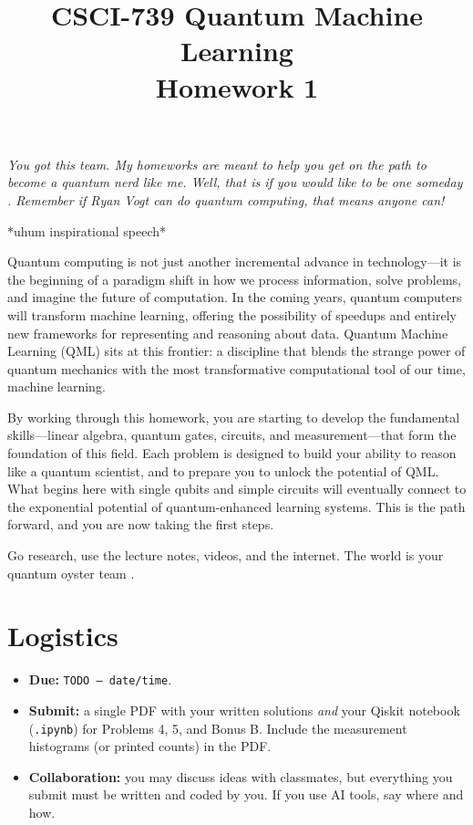 \documentclass[11pt]{article}
\title{CSCI-739 Quantum Machine Learning\\[2pt]
\large Homework 1}
\date{} %
\newcounter{problem}
\begin{document}
\maketitle

\begin{center}
\textit{You got this team. My homeworks are meant to help you get on the path to become a quantum nerd like me. Well, that is if you would like to be one someday \smiley{}. Remember if Ryan Vogt can do quantum computing, that means anyone can! }
\end{center}

\vspace{1em}

\noindent
*uhum inspirational speech*

Quantum computing is not just another incremental advance in technology—it is the beginning of a paradigm shift in how we process information, solve problems, and imagine the future of computation. In the coming years, quantum computers will transform machine learning, offering the possibility of speedups and entirely new frameworks for representing and reasoning about data. Quantum Machine Learning (QML) sits at this frontier: a discipline that blends the strange power of quantum mechanics with the most transformative computational tool of our time, machine learning. 

By working through this homework, you are starting to develop the fundamental skills—linear algebra, quantum gates, circuits, and measurement—that form the foundation of this field. Each problem is designed to build your ability to reason like a quantum scientist, and to prepare you to unlock the potential of QML. What begins here with single qubits and simple circuits will eventually connect to the exponential potential of quantum-enhanced learning systems. This is the path forward, and you are now taking the first steps.

Go research, use the lecture notes, videos, and the internet. The world is your quantum oyster team \smiley{}.

\vspace{1em}

\section*{Logistics}
\begin{itemize}
  \item \textbf{Due:} \texttt{TODO -- date/time}.
  \item \textbf{Submit:} a single PDF with your written solutions \emph{and} your Qiskit notebook (\texttt{.ipynb}) for Problems 4, 5, and Bonus B. Include the measurement histograms (or printed counts) in the PDF.
  \item \textbf{Collaboration:} you may discuss ideas with classmates, but everything you submit must be written and coded by you. If you use AI tools, say where and how.
\end{itemize}
\end{document}
